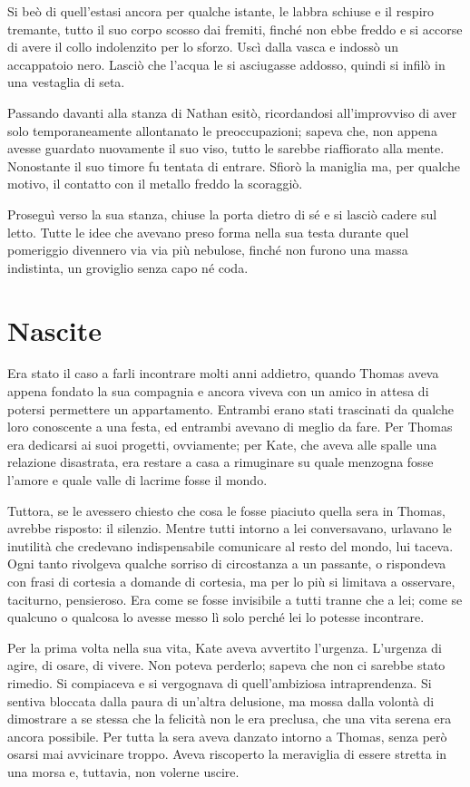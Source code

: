 \documentclass[a4paper,oneside,11pt]{memoir}
\begin{document}
Si beò di quell'estasi ancora per qualche istante, le labbra schiuse e il respiro tremante, tutto il suo corpo scosso
dai fremiti, finché non ebbe freddo e si accorse di avere il collo indolenzito per lo sforzo. Uscì dalla vasca e
indossò un accappatoio nero. Lasciò che l'acqua le si asciugasse addosso, quindi si infilò in una vestaglia di seta.

Passando davanti alla stanza di Nathan esitò, ricordandosi all'improvviso di aver solo temporaneamente allontanato le
preoccupazioni; sapeva che, non appena avesse guardato nuovamente il suo viso, tutto le sarebbe riaffiorato alla mente.
Nonostante il suo timore fu tentata di entrare. Sfiorò la maniglia ma, per qualche motivo, il contatto con il metallo
freddo la scoraggiò.

Proseguì verso la sua stanza, chiuse la porta dietro di sé e si lasciò cadere sul letto. Tutte le idee che avevano
preso forma nella sua testa durante quel pomeriggio divennero via via più nebulose, finché non furono una massa
indistinta, un groviglio senza capo né coda.

\chapter{Nascite}

Era stato il caso a farli incontrare molti anni addietro, quando Thomas aveva appena fondato la sua compagnia e ancora
viveva con un amico in attesa di potersi permettere un appartamento. Entrambi erano stati trascinati da qualche loro
conoscente a una festa, ed entrambi avevano di meglio da fare. Per Thomas era dedicarsi ai suoi progetti, ovviamente;
per Kate, che aveva alle spalle una relazione disastrata, era restare a casa a rimuginare su quale menzogna fosse
l'amore e quale valle di lacrime fosse il mondo.

Tuttora, se le avessero chiesto che cosa le fosse piaciuto quella sera in Thomas, avrebbe risposto: il silenzio. Mentre
tutti intorno a lei conversavano, urlavano le inutilità che credevano indispensabile comunicare al resto del mondo, lui
taceva. Ogni tanto rivolgeva qualche sorriso di circostanza a un passante, o rispondeva con frasi di cortesia a
domande di cortesia, ma per lo più si limitava a osservare, taciturno, pensieroso. Era come se fosse invisibile a tutti
tranne che a lei; come se qualcuno o qualcosa lo avesse messo lì solo perché lei lo potesse incontrare.

Per la prima volta nella sua vita, Kate aveva avvertito l'urgenza. L'urgenza di agire, di osare, di vivere. Non poteva
perderlo; sapeva che non ci sarebbe stato rimedio. Si compiaceva e si vergognava di quell'ambiziosa intraprendenza. Si
sentiva bloccata dalla paura di un'altra delusione, ma mossa dalla volontà di dimostrare a se stessa che la felicità non
le era preclusa, che una vita serena era ancora possibile. Per tutta la sera aveva danzato intorno a Thomas, senza però
osarsi mai avvicinare troppo. Aveva riscoperto la meraviglia di essere stretta in una morsa e, tuttavia, non volerne
uscire.
\end{document}
